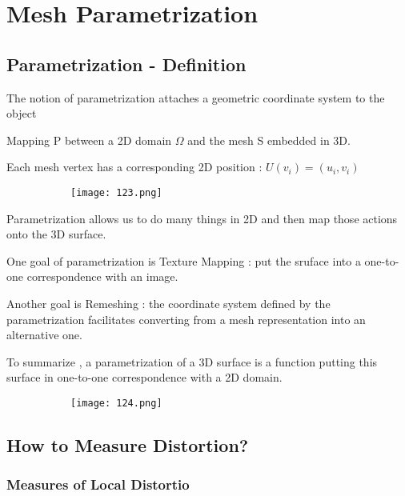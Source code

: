 \documentclass{article}
\begin{document}
\vspace{10mm}

\section{Mesh Parametrization}

\subsection{Parametrization - Definition}

The notion of parametrization attaches a geometric coordinate system to the object

Mapping P between a 2D domain $\Omega$ and the mesh S embedded in 3D.

Each mesh vertex has a corresponding 2D position : $U(v_i) = (u_i,v_i)$


    \begin{figure}[ht!]
  \centering
  \begin{subfigure}[b]{0.5\linewidth}
    \texttt{[image: 123.png]}
  \end{subfigure}
\end{figure}

Parametrization allows us to do many things in 2D and then map those actions onto the 3D surface.

One goal of parametrization is Texture Mapping : put the sruface into a one-to-one correspondence with an image.

Another goal is Remeshing : the coordinate system defined by the parametrization facilitates converting from a mesh representation into an alternative one.

To summarize , a parametrization of a 3D surface is a function putting this surface in one-to-one correspondence with a 2D domain.

    \begin{figure}[ht!]
  \centering
  \begin{subfigure}[b]{0.5\linewidth}
    \texttt{[image: 124.png]}
  \end{subfigure}
\end{figure}

\subsection{How to Measure Distortion?}

\subsubsection{Measures of Local Distortio}
\end{document}
